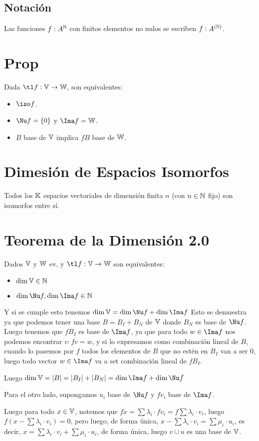 \documentclass{article}
\begin{document}
\subsection{Notación}
Las funciones $f : A^{\mathbb{N}}$ con finitos elementos no nulos se escriben $f : A^{(\mathbb{N})}$.

\section{Prop}
Dada $\tl f : \V \to \W$, son equivalentes:
\begin{itemize}
	\item $\iso f$.
	\item $\Nu f = \{0\}$ y $\Ima f = \W$.
	\item $B$ base de $\mathbb{V}$ implica $f B$ base de $\mathbb{W}$.
\end{itemize}

\section{Dimesión de Espacios Isomorfos}
Todos los $\mathbb{K}$ espacios vectoriales de dimensión finita $n$ (con $n \in \mathbb{N}$ fijo) son
isomorfos entre sí.

\section{Teorema de la Dimensión 2.0}
Dados $\mathbb{V}$ y $\mathbb{W}$ ev, y $\tl f: \V \to \W$ son equivalentes:
\begin{itemize}
	\item $\dim \mathbb{V} \in \mathbb{N}$
	\item $\dim \Nu f, \dim \Ima f \in \N$
\end{itemize}

Y si se cumple esto tenemos $\dim \V = \dim \Nu f + \dim \Ima f$
Esto se demuestra ya que podemos tener una base $B = B_I + B_N$ de $\mathbb{V}$ donde $B_N$ es base
de $\Nu f$. Luego tenemos que $f B_I$ es base de $\Ima f$, ya que para todo $w \in \Ima f$
nos podemos encontrar $v : fv = w$, y si lo expresamos como combinación lineal de $B$,
cuando lo pasemos por $f$ todos los elementos de $B$ que no estén en $B_I$ van a ser $0$,
luego todo vector $w \in \Ima f$ va a set combinación lineal de $f B_I$.

Luego $\dim \V = |B| = |B_I| + |B_N| = \dim \Ima f + \dim \Nu f$

Para el otro lado, supongamos $u_i$ base de $\Nu f$ y $f v_i$ base de $\Ima f$.

Luego para todo $x \in \mathbb{V}$, notemos que
$fx = \sum \lambda_i \cdot f v_i = f \sum \lambda_i \cdot v_i$, luego
$f \left(x - \sum \lambda_i \cdot v_i\right) = 0$, pero luego, de forma única,
$x - \sum \lambda_i \cdot v_i = \sum \mu_i \cdot u_i$, es decir, 
$x = \sum \lambda_i \cdot v_i + \sum \mu_i \cdot u_i$, de forma única, luego $v \cup u$ es
una base de $\mathbb{V}$.
\end{document}
